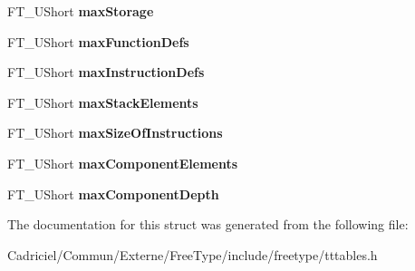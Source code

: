 \begin{DoxyCompactItemize}
\item 
\hypertarget{struct_t_t___max_profile___a502a8579e3d358f3c00776ed0cc8a168}{F\-T\-\_\-\-U\-Short {\bfseries max\-Storage}}\label{struct_t_t___max_profile___a502a8579e3d358f3c00776ed0cc8a168}

\item 
\hypertarget{struct_t_t___max_profile___acc24e822a62bbfaa86d36f691fcde60b}{F\-T\-\_\-\-U\-Short {\bfseries max\-Function\-Defs}}\label{struct_t_t___max_profile___acc24e822a62bbfaa86d36f691fcde60b}

\item 
\hypertarget{struct_t_t___max_profile___a3f7bd433baede417293415cf60f20d8f}{F\-T\-\_\-\-U\-Short {\bfseries max\-Instruction\-Defs}}\label{struct_t_t___max_profile___a3f7bd433baede417293415cf60f20d8f}

\item 
\hypertarget{struct_t_t___max_profile___a2df9b9ff2a5a9daaa7c3d40fe024637f}{F\-T\-\_\-\-U\-Short {\bfseries max\-Stack\-Elements}}\label{struct_t_t___max_profile___a2df9b9ff2a5a9daaa7c3d40fe024637f}

\item 
\hypertarget{struct_t_t___max_profile___ac458411198b09d303ec8ae206e6926b6}{F\-T\-\_\-\-U\-Short {\bfseries max\-Size\-Of\-Instructions}}\label{struct_t_t___max_profile___ac458411198b09d303ec8ae206e6926b6}

\item 
\hypertarget{struct_t_t___max_profile___a110e6d735610c6d8fd89221d03440c32}{F\-T\-\_\-\-U\-Short {\bfseries max\-Component\-Elements}}\label{struct_t_t___max_profile___a110e6d735610c6d8fd89221d03440c32}

\item 
\hypertarget{struct_t_t___max_profile___a9ae1f117c954e0711b03f1675d6191d9}{F\-T\-\_\-\-U\-Short {\bfseries max\-Component\-Depth}}\label{struct_t_t___max_profile___a9ae1f117c954e0711b03f1675d6191d9}

\end{DoxyCompactItemize}


The documentation for this struct was generated from the following file\-:\begin{DoxyCompactItemize}
\item 
Cadriciel/\-Commun/\-Externe/\-Free\-Type/include/freetype/tttables.\-h\end{DoxyCompactItemize}
